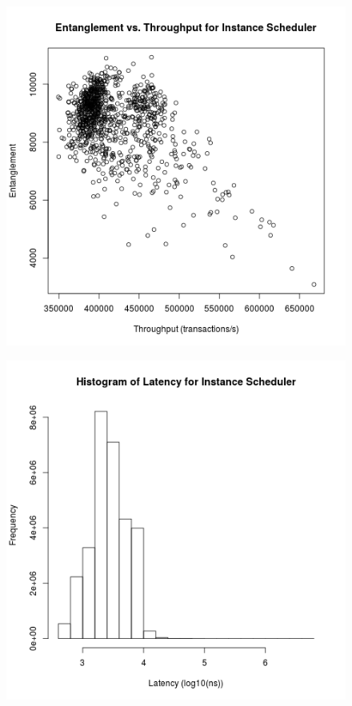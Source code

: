 \begin{figure}
\center
\includegraphics[width=\textwidth]{instance_throughput_entanglement.png}
\caption{\label{instance_throughput_entanglement}}
\end{figure}


\begin{figure}
\center
\includegraphics[width=\textwidth]{instance_latency_hist.png}
\caption{\label{instance_latency}}
\end{figure}

